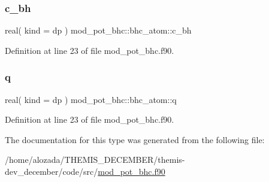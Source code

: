 \subsubsection{\texorpdfstring{c\+\_\+bh}{c\_bh}}
{\footnotesize\ttfamily real( kind = dp ) mod\+\_\+pot\+\_\+bhc\+::bhc\+\_\+atom\+::c\+\_\+bh}



Definition at line 23 of file mod\+\_\+pot\+\_\+bhc.\+f90.

\mbox{\label{structmod__pot__bhc_1_1bhc__atom_af654cd806c3f5175cd87c6ebb1cf6181}} 
\subsubsection{\texorpdfstring{q}{q}}
{\footnotesize\ttfamily real( kind = dp ) mod\+\_\+pot\+\_\+bhc\+::bhc\+\_\+atom\+::q}



Definition at line 23 of file mod\+\_\+pot\+\_\+bhc.\+f90.



The documentation for this type was generated from the following file\+:\begin{DoxyCompactItemize}
\item 
/home/alozada/\+T\+H\+E\+M\+I\+S\+\_\+\+D\+E\+C\+E\+M\+B\+E\+R/themis-\/dev\+\_\+december/code/src/\hyperlink{mod__pot__bhc_8f90}{mod\+\_\+pot\+\_\+bhc.\+f90}\end{DoxyCompactItemize}
